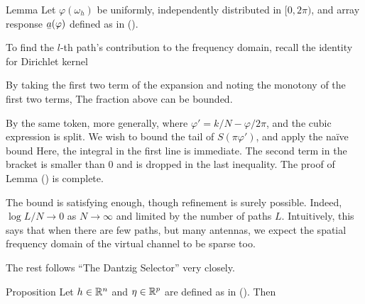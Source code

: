 \Result
{Lemma}
{
Let \(\varphi (\omega_h)\) be uniformly, independently distributed in \([0,2\pi)\), and array response \(\V{a} (\varphi)\) defined as in ().
%
%
}

To find the \(l\)-th path's contribution to the frequency domain, recall the identity for Dirichlet kernel
%
%

By taking the first two term of the expansion
%
%
and noting the monotony of the first two terms,
%
%
The fraction above can be bounded.

By the same token, more generally,
%
%
where \(\varphi' =k/N -\varphi/2\pi\), and the cubic expression is split.
We wish to bound the tail of \(S (\pi \varphi')\), and apply the na\"ive bound
%
%
Here, the integral in the first line is immediate.
The second term in the bracket is smaller than 0 and is dropped in the last inequality.
The proof of Lemma () is complete.

The bound is satisfying enough, though refinement is surely possible.
Indeed, \(\log L/N \to 0\) as \(N \to \infty\) and limited by the number of paths \(L\).
Intuitively, this says that when there are few paths, but many antennas, we expect the spatial frequency domain of the virtual channel to be sparse too.

The rest follows ``The Dantzig Selector'' very closely.


\Result
{Proposition}
{
Let \(h \in \mathbb{R}^n\) and \(\eta \in \mathbb{R}^p\) are defined as in ().
Then
%
%
}

